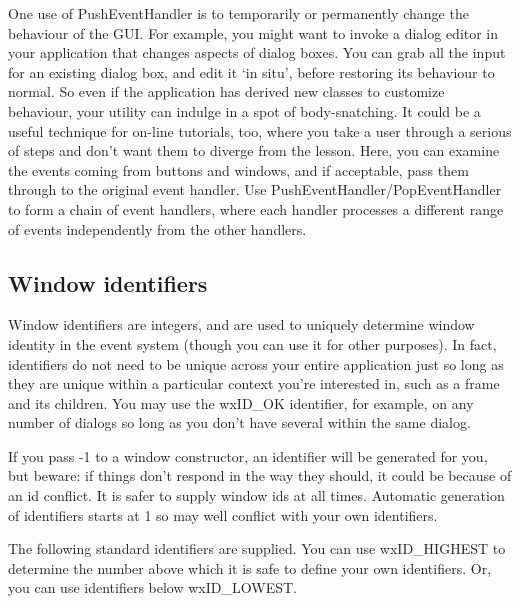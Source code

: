 One use of PushEventHandler is to temporarily or permanently change the
behaviour of the GUI. For example, you might want to invoke a dialog editor
in your application that changes aspects of dialog boxes. You can
grab all the input for an existing dialog box, and edit it `in situ',
before restoring its behaviour to normal. So even if the application
has derived new classes to customize behaviour, your utility can indulge
in a spot of body-snatching. It could be a useful technique for on-line
tutorials, too, where you take a user through a serious of steps and
don't want them to diverge from the lesson. Here, you can examine the events
coming from buttons and windows, and if acceptable, pass them through to
the original event handler. Use PushEventHandler/PopEventHandler
to form a chain of event handlers, where each handler processes a different
range of events independently from the other handlers.

\subsection{Window identifiers}\label{windowids}

Window identifiers are integers, and are used to uniquely determine window identity in the
event system (though you can use it for other purposes). In fact, identifiers do not need
to be unique across your entire application just so long as they are unique within a particular context you're interested
in, such as a frame and its children. You may use the wxID\_OK identifier, for example, on
any number of dialogs so long as you don't have several within the same dialog.

If you pass -1 to a window constructor, an identifier will be generated for you, but beware:
if things don't respond in the way they should, it could be because of an id conflict. It is safer
to supply window ids at all times. Automatic generation of identifiers starts at 1 so may well conflict
with your own identifiers.

The following standard identifiers are supplied. You can use wxID\_HIGHEST to determine the
number above which it is safe to define your own identifiers. Or, you can use identifiers below
wxID\_LOWEST.


